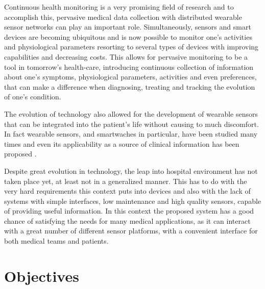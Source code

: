 Continuous health monitoring is a very promising field of research \cite{prospective} and to accomplish this, pervasive medical data collection with distributed wearable sensor networks can play an important role. Simultaneously, sensors and smart devices are becoming ubiquitous and is now possible to monitor one's activities and physiological parameters resorting to several types of devices with improving capabilities and decreasing costs. This allows for pervasive monitoring to be a tool in tomorrow's health-care, introducing continuous collection of information about one's symptoms, physiological parameters, activities and even preferences, that can make a difference when diagnosing, treating and tracking the evolution of one's condition.

The evolution of technology also allowed for the development of wearable sensors that can be integrated into the patient's life without causing to much discomfort. In fact wearable sensors, and smartwaches in particular,  have been studied many times \cite{wearables, sensor} and even its applicability as a source of clinical information has been proposed \cite{compare, relogioarritmia, doenca2}.

Despite great evolution in technology, the leap into hospital environment has not taken place yet, at least  not in a generalized manner. This has to do with the very hard requirements this context puts into devices and also with the lack of systems with simple interfaces, low maintenance and high quality sensors, capable of providing useful information. In this context the proposed system has a good chance of satisfying the needs for many medical applications, as it can interact with a great number of different sensor platforms, with a convenient interface for both medical teams and patients.



%


\section{Objectives}
\label{section:objectives}


